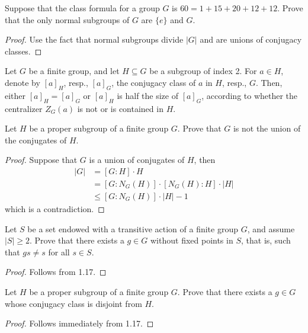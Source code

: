 \documentclass[openany]{book}
\begin{document}
\begin{prob}
Suppose that the class formula for a group $G$ is $60 = 1 + 15 + 20 + 12 + 12$. Prove that the only normal subgroups of $G$ are $\{e\}$ and $G$.
\end{prob}
\begin{proof}
    Use the fact that normal subgroups divide $|G|$ and are unions of conjugacy classes.
\end{proof}

\begin{prop}
    Let $G$ be a finite group, and let $H \subseteq G$ be a subgroup of index 2. For $a \in H$, denote by $[a]_H$, resp., $[a]_G$, the conjugacy class of $a$ in $H$, resp., $G$. Then, either $[a]_H = [a]_G$ or $[a]_H$ is half the size of $[a]_G$, according to whether the centralizer $Z_G(a)$ is not or is contained in $H$.
\end{prop}


\begin{prob}[1.17]
Let $H$ be a proper subgroup of a finite group $G$. Prove that $G$ is not the union of the conjugates of $H$. 
\end{prob}
\begin{proof}
    Suppose that $G$ is a union of conjugates of $H$, then 
    \begin{align*}
        |G|&=[G:H]\cdot H\\
        &=[G:N_G(H)]\cdot [N_G(H): H]\cdot |H|\\
        &\leq [G:N_G(H)]\cdot |H|-1
    \end{align*}
which is a contradiction.
\end{proof}

\begin{prob}[1.18]
Let $S$ be a set endowed with a transitive action of a finite group $G$, and assume $|S| \geq 2$. Prove that there exists a $g \in G$ without fixed points in $S$, that is, such that $gs \neq s$ for all $s \in S$. 



\end{prob}
\begin{proof}
    Follows from 1.17.
\end{proof}


\begin{prob}[1.19]
Let $H$ be a proper subgroup of a finite group $G$. Prove that there exists a $g \in G$ whose conjugacy class is disjoint from $H$.
\end{prob}
\begin{proof}
    Follows immediately from 1.17.
\end{proof}
\end{document}

